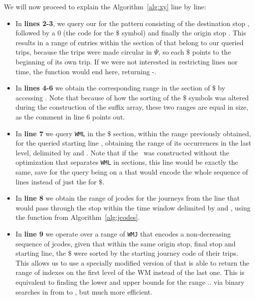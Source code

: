     We will now proceed to explain the Algorithm~\ref{alg:xy} line by line:
    \begin{itemize}
        \item In \textbf{lines 2-3}, we query our  for the pattern consisting of the destination stop , followed by a 0 (the code for the $\$$ symbol) and finally the origin stop . This results in a range of entries within the section of  that belong to our queried trips, because the trips were made circular in $\Psi$, so each $\$$ points to the beginning of its own trip. If we were not interested in restricting lines nor time, the function would end here, returning -.
        
        \item In \textbf{lines 4-6} we obtain the corresponding range in the section of $\$$ by accessing \FuncSty{$\Psi$}. Note that because of how the sorting of the $\$$ symbols was altered during the construction of the suffix array, these two ranges are equal in size, as the comment in line 6 points out.
        
        \item In \textbf{line 7} we query \texttt{WML} in the $\$$ section, within the range previously obtained, for the queried starting line , obtaining the range of its occurrences in the last level, delimited by  and . Note that if the \ctr~was constructed without the optimization that separates \texttt{WML} in sections, this line would be exactly the same, save for the query being on a  that would encode the whole sequence of lines instead of just the  for $\$$.
        
        \item In \textbf{line 8} we obtain the range of jcodes for the journeys from the line  that would pass through the stop  within the time window delimited by  and , using the function  from Algorithm~\ref{alg:jcodes}.
        
        \item In \textbf{line 9} we operate over a range of \texttt{WMJ} that encodes a non-decreasing sequence of jcodes, given that within the same origin stop, final stop and starting line, the $\$$ were sorted by the starting journey code of their trips. This allows us to use a specially modified version of  that is able to return the range of indexes on the first level of the WM instead of the last one. This is equivalent to finding the lower and upper bounds for the range $..$ via binary searches in  from  to , but much more efficient.
        

\end{itemize}
